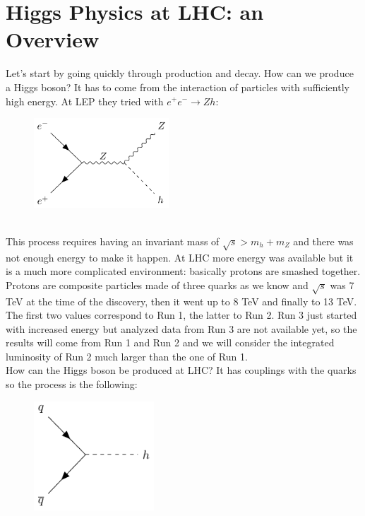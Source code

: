 \documentclass[../main.tex]{subfiles}
\begin{document}
\section{Higgs Physics at LHC: an Overview}
Let's start by going quickly through production and decay. How can we produce a Higgs boson? It has to come from the interaction of particles with sufficiently high energy. At LEP they tried with $e^+e^-\to Zh$:
\begin{figure}[h]
    \centering
    \includegraphics[width=0.45\textwidth]{Images/higgslep.pdf}
    \caption*{}
\end{figure}\\
This process requires having an invariant mass of $\sqrt{s}>m_h+m_Z$ and there was not enough energy to make it happen. At LHC more energy was available but it is a much more complicated environment: basically protons are smashed together. Protons are composite particles made of three quarks as we know and $\sqrt{s}$ was 7 TeV at the time of the discovery, then it went up to 8 TeV and finally to 13 TeV. The first two values correspond to Run 1, the latter to Run 2. Run 3 just started with increased energy but analyzed data from Run 3 are not available yet, so the results will come from Run 1 and Run 2 and we will consider the integrated luminosity of Run 2 much larger than the one of Run 1.\\
How can the Higgs boson be produced at LHC? It has couplings with the quarks so the process is the following:
\begin{figure}[h]
    \centering
    \includegraphics[width=0.4\textwidth]{Images/qqhiggs.pdf}
    \caption*{}
\end{figure}\\
\end{document}
